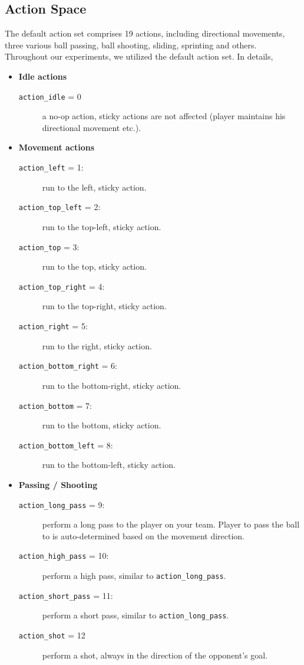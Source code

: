 \subsection{Action Space}
The default action set comprises 19 actions, including directional movements, three various ball passing, ball shooting, sliding, sprinting and others. Throughout our experiments, we utilized the default action set. In details,
\begin{itemize}[noitemsep]
  \item \textbf{Idle actions}
  \begin{description}
    \item[\texttt{action\_idle} = 0] a no-op action, sticky actions are not affected (player maintains his directional movement etc.).
  \end{description}
  
  \item \textbf{Movement actions}
  \begin{description}
    \item[\texttt{action\_left} = 1: ] run to the left, sticky action.
    \item[\texttt{action\_top\_left} = 2: ] run to the top-left, sticky action.
    \item[\texttt{action\_top} = 3: ] run to the top, sticky action.
    \item[\texttt{action\_top\_right} = 4: ] run to the top-right, sticky action.
    \item[\texttt{action\_right} = 5: ] run to the right, sticky action.
    \item[\texttt{action\_bottom\_right} = 6: ] run to the bottom-right, sticky action.
    \item[\texttt{action\_bottom} = 7: ] run to the bottom, sticky action.
    \item[\texttt{action\_bottom\_left} = 8: ] run to the bottom-left, sticky action.
  \end{description}
  
  \item \textbf{Passing / Shooting}
  \begin{description}
    \item[\texttt{action\_long\_pass} = 9: ] perform a long pass to the player on your team. Player to pass the ball to is auto-determined based on the movement direction.
    \item[\texttt{action\_high\_pass} = 10: ] perform a high pass, similar to \texttt{action\_long\_pass}.
    \item[\texttt{action\_short\_pass} = 11: ] perform a short pass, similar to \texttt{action\_long\_pass}.
    \item[\texttt{action\_shot} = 12] perform a shot, always in the direction of the opponent's goal.
  \end{description}
  

\end{itemize}
